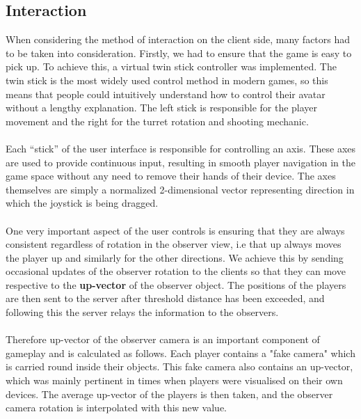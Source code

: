 \documentclass[11pt,a4paper]{article}
\begin{document}
   \subsection{Interaction}
     When considering the method of interaction on the client side, many factors had to be taken into consideration. Firstly, we had to ensure that the game is easy to pick up. To achieve this, a virtual twin stick controller was implemented. The twin stick is the most widely used control method in modern games, so this means that people could intuitively understand how to control their avatar without a lengthy explanation. The left stick is responsible for the player movement and the right for the turret rotation and shooting mechanic. \\ \\
     Each “stick” of the user interface is responsible for controlling an axis. These axes are used to provide continuous input, resulting in smooth player navigation in the game space without any need to remove their hands of their device. The axes themselves are simply a normalized 2-dimensional vector representing direction in which the joystick is being dragged. \\ \\
     One very important aspect of the user controls is ensuring that they are always consistent regardless of rotation in the observer view, i.e that up always moves the player up and similarly for the other directions. We achieve this by sending occasional updates of the observer rotation to the clients so that they can move respective to the \textbf{up-vector} of the observer object. The positions of the players are then sent to the server after threshold distance has been exceeded, and following this the server relays the information to the observers. \\ \\
     Therefore up-vector of the observer camera is an important component of gameplay and is calculated as follows. Each player contains a "fake camera" which is carried round inside their objects. This fake camera also contains an up-vector, which was mainly pertinent in times when players were visualised on their own devices. The average up-vector of the players is then taken, and the observer camera rotation is interpolated with this new value.
\end{document}
